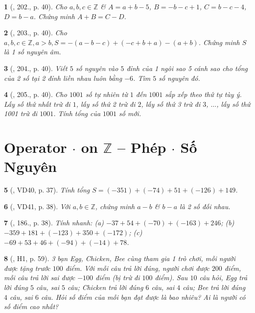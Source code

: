 \documentclass{article}
\newtheorem{baitoan}{}
\begin{document}
\begin{baitoan}[\cite{Tuyen_Toan_6}, 202., p. 40]
	Cho $a,b,c\in\mathbb{Z}$ \& $A = a + b - 5$, $B = -b - c + 1$, $C = b - c - 4$, $D = b - a$. Chứng minh $A + B = C - D$.
\end{baitoan}

\begin{baitoan}[\cite{Tuyen_Toan_6}, 203., p. 40]
	Cho $a,b,c\in\mathbb{Z},a > b,S = -(a - b - c) + (-c + b + a) - (a + b)$. Chứng minh $S$ là 1 số nguyên âm.
\end{baitoan}

\begin{baitoan}[\cite{Tuyen_Toan_6}, 204., p. 40]
	Viết $5$ số nguyên vào $5$ đỉnh của 1 ngôi sao 5 cánh sao cho tổng của 2 số tại 2 đỉnh liền nhau luôn bằng $-6$. Tìm $5$ số nguyên đó.
\end{baitoan}

\begin{baitoan}[\cite{Tuyen_Toan_6}, 205., p. 40]
	Cho $1001$ số tự nhiên từ $1$ đến $1001$ sắp xếp theo thứ tự tùy ý. Lấy số thứ nhất trừ đi $1$, lấy số thứ 2 trừ đi $2$, lấy số thứ 3 trừ đi $3$, $\ldots$, lấy số thứ 1001 trừ đi $1001$. Tính tổng của $1001$ số mới.
\end{baitoan}


\section{Operator $\cdot$ on $\mathbb{Z}$ -- Phép $\cdot$ Số Nguyên}

\begin{baitoan}[\cite{Tuyen_Toan_6}, VD40, p. 37]
	Tính tổng $S = (-351) + (-74) + 51 + (-126) + 149$.
\end{baitoan}

\begin{baitoan}[\cite{Tuyen_Toan_6}, VD41, p. 38]
	Với $a,b\in\mathbb{Z}$, chứng minh $a - b$ \& $b - a$ là 2 số đối nhau.
\end{baitoan}

\begin{baitoan}[\cite{Tuyen_Toan_6}, 186., p. 38]
	Tính nhanh: (a) $-37 + 54 + (-70) + (-163) + 246$; (b) $-359 + 181 + (-123) + 350 + (-172)$; (c) $-69 + 53 + 46 + (-94) + (-14) + 78$.
\end{baitoan}

\begin{baitoan}[\cite{Binh_boi_duong_Toan_6_tap_1}, H1, p. 59]
	3 bạn Egg, Chicken, Bee cùng tham gia 1 trò chơi, mỗi người được tặng trước $100$ điểm. Với mỗi câu trả lời đúng, người chơi được $200$ điểm, mỗi câu trả lời sai được $-100$ điểm (bị trừ đi $100$ điểm). Sau $10$ câu hỏi, Egg trả lời đúng $5$ câu, sai $5$ câu; Chicken trả lời đúng $6$ câu, sai $4$ câu; Bee trả lời đúng $4$ câu, sai $6$ câu. Hỏi số điểm của mỗi bạn đạt được là bao nhiêu? Ai là người có số điểm cao nhất?
\end{baitoan}
\end{document}
